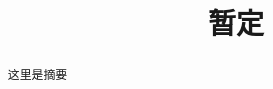 \documentclass{myclass}
\title{暂定}
\begin{document}
\maketitle
\begin{abstract}
这里是摘要
\end{abstract}






\end{document}
